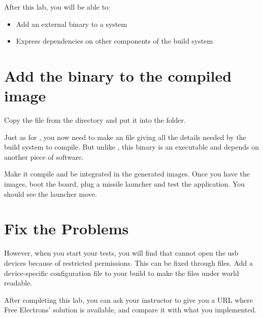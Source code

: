 
After this lab, you will be able to:
\begin{itemize}
  \item Add an external binary to a system
  \item Express dependencies on other components of the build system
\end{itemize}

\section{Add the binary to the compiled image}
Copy the  file from the
 directory and put it
into the  folder.

Just as for , you now need to make an  file
giving all the details needed by the build system to compile. But
unlike , this binary is an executable and depends on another
piece of software.

Make it compile and be integrated in the generated images. Once you
have the images, boot the board, plug a missile launcher and test the
application. You should see the launcher move.

\section{Fix the Problems}

However, when you start your tests, you will find that  cannot open
the usb devices because of restricted permissions. This can be fixed
through  files. Add a device-specific 
configuration file to your build to make the files under
 world readable.

After completing this lab, you can ask your instructor to
give you a URL where Free Electrons' solution is available, and compare
it with what you implemented.
